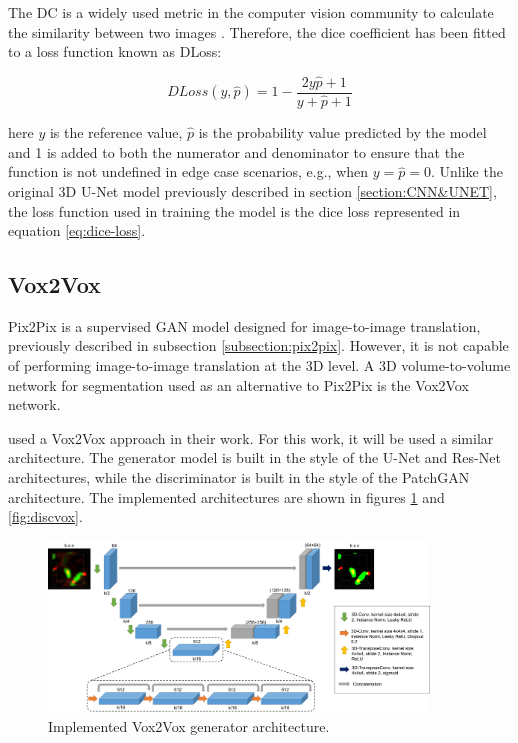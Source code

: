 The \ac{DC} is a widely used metric in the computer vision community to calculate the similarity between two images \cite{diceloss}. Therefore, the dice coefficient has been fitted to a loss function known as \ac{DLoss}:

\begin{equation}
    DLoss(y,\hat{p}) = 1 - \frac{2y\hat{p}+1}{y+\hat{p}+1}
    \label{eq:dice-loss}
\end{equation}

\noindent here $y$ is the reference value, $\hat{p}$ is the probability value predicted by the model and 1 is added to both the numerator and denominator to ensure that the function is not undefined in edge case scenarios, e.g., when $y=\hat{p}=0$. Unlike the original 3D U-Net model \cite{Unet:3D} previously described in section \ref{section:CNN&UNET}, the loss function used in training the model is the dice loss represented in equation \ref{eq:dice-loss}.

\subsection{Vox2Vox}

Pix2Pix is a supervised GAN model designed for image-to-image translation, previously described in subsection \ref{subsection:pix2pix}. However, it is not capable of performing image-to-image translation at the 3D level. A 3D volume-to-volume network for segmentation used as an alternative to Pix2Pix is the Vox2Vox network.

\citet{vox2vox} used a Vox2Vox approach in their work. For this work, it will be used a similar architecture. The generator model is built in the style of the U-Net and Res-Net \cite{2015deep} architectures, while the discriminator is built in the style of the PatchGAN \cite{isola2018imagetoimage}  architecture. The implemented architectures are shown in figures \ref{fig:genvox} and \ref{fig:discvox}.

\begin{figure}[!htb]
  \centering
  \includegraphics[width=0.90\textwidth]{Images/Picture2.jpg}
  \caption[Implemented Vox2Vox generator architecture.]{Implemented Vox2Vox generator architecture.}
  \label{fig:genvox}
\end{figure}


